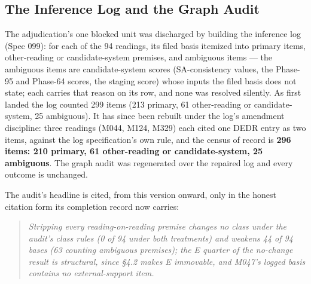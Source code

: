 \documentclass[11pt]{article}
\newcounter{none} %
\begin{document}
\subsection{The Inference Log and the Graph
Audit}\label{appendix-d10-spec099}

The adjudication's one blocked unit was discharged by building
the inference log (Spec 099): for each of the 94 readings, its
filed basis itemized into primary items, other-reading or
candidate-system premises, and ambiguous items --- the ambiguous
items are candidate-system scores (SA-consistency values, the
Phase-95 and Phase-64 scores, the staging score) whose inputs
the filed basis does not state; each carries that reason on its
row, and none was resolved silently. As first landed the log
counted 299 items (213 primary, 61 other-reading or
candidate-system, 25 ambiguous). It has since been rebuilt under
the log's amendment discipline: three readings (M044, M124,
M329) each cited one DEDR entry as two items, against the log
specification's own rule, and the census of record is
\textbf{296 items: 210 primary, 61 other-reading or
candidate-system, 25 ambiguous}. The graph audit was regenerated
over the repaired log and every outcome is unchanged.

The audit's headline is cited, from this version onward, only in
the honest citation form its completion record now carries:

\begin{quote}
\emph{Stripping every reading-on-reading premise changes no
class under the audit's class rules (0 of 94 under both
treatments) and weakens 44 of 94 bases (63 counting ambiguous
premises); the E quarter of the no-change result is structural,
since §4.2 makes E immovable, and M047's logged basis contains
no external-support item.}
\end{quote}
\end{document}
